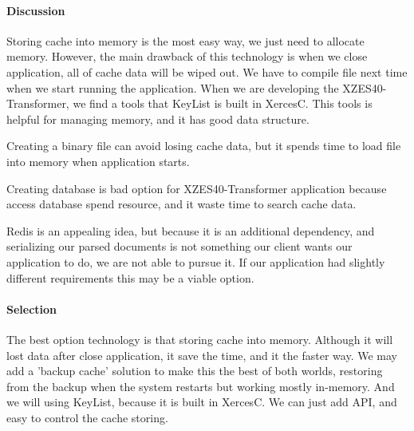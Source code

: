 \paragraph{Discussion}

Storing cache into memory is the most easy way, we just need to allocate memory.
However, the main drawback of this technology is when we close application, all of cache data will be wiped out.
We have to compile file next time when we start running the application.
When we are developing the XZES40-Transformer, we find a tools that KeyList is built in XercesC.
This tools is helpful for managing memory, and it has good data structure.

Creating a binary file can avoid losing cache data, but it spends time to load file into memory when application starts.

Creating database is bad option for XZES40-Transformer application because access database spend resource, and it waste time to search cache data.

Redis is an appealing idea, but because it is an additional dependency, and serializing our parsed documents is not something our client wants our application to do, we are not able to pursue it.
If our application had slightly different requirements this may be a viable option.

\paragraph{Selection}

The best option technology is that storing cache into memory.
Although it will lost data after close application, it save the time, and it the faster way.
We may add a 'backup cache' solution to make this the best of both worlds, restoring from the backup when the system restarts but working mostly in-memory.
And we will using KeyList, because it is built in XercesC.
We can just add API, and easy to control the cache storing.

